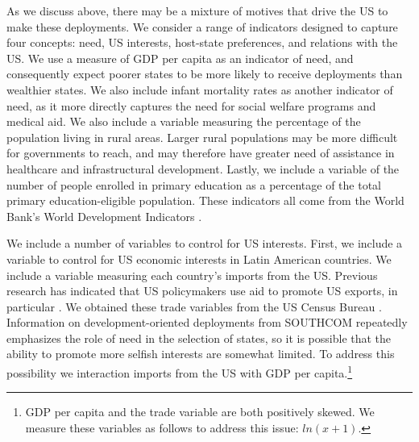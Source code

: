 \documentclass[12pt]{article}
\begin{document}
\begin{doublespace}
As we discuss above, there may be a mixture of motives that drive the US to make these deployments. We consider a range of indicators designed to capture four concepts: need, US interests, host-state preferences, and relations with the US. We use a measure of GDP per capita as an indicator of need, and consequently expect poorer states to be more likely to receive deployments than wealthier states. We also include infant mortality rates as another indicator of need, as it more directly captures the need for social welfare programs and medical aid. We also include a variable measuring the percentage of the population living in rural areas. Larger rural populations may be more difficult for governments to reach, and may therefore have greater need of assistance in healthcare and infrastructural development. Lastly, we include a variable of the number of people enrolled in primary education as a percentage of the total primary education-eligible population. These indicators all come from the World Bank's World Development Indicators \cite{WDI2015}.

We include a number of variables to control for US interests. First, we include a variable to control for US economic interests in Latin American countries. We include a variable measuring each country's imports from the US. Previous research has indicated that US policymakers use aid to promote US exports, in particular \cite{FleckKilby2006,MilnerTingley2010}. We obtained these trade variables from the US Census Bureau \cite{Census2015}. Information on development-oriented deployments from SOUTHCOM repeatedly emphasizes the role of need in the selection of states, so it is possible that the ability to promote more selfish interests are somewhat limited. To address this possibility we interaction imports from the US with GDP per capita.\footnote{GDP per capita and the trade variable are both positively skewed. We measure these variables as follows to address this issue: $ln(x+1)$.} 


\end{doublespace}
\end{document}
